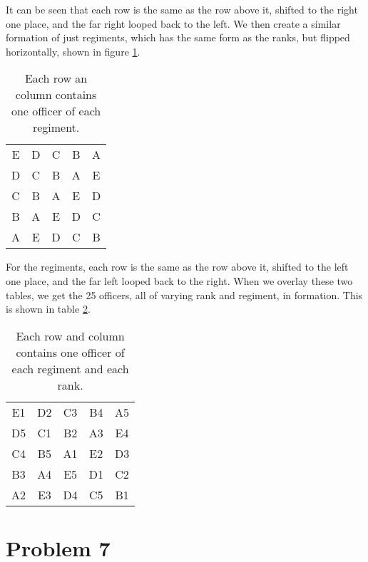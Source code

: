 \documentclass[12pt]{article}
\begin{document}
It can be seen that each row is the same as the row above it, shifted to the right one place, and the far right looped back to the left. We then create a similar formation of just regiments, which has the same form as the ranks, but flipped horizontally, shown in figure \ref{tab:regim}.

\begin{table}[ht]
    \centering
    \begin{tabular}{ccccc}
        E & D & C & B & A \\
        D & C & B & A & E \\
        C & B & A & E & D \\
        B & A & E & D & C \\
        A & E & D & C & B \\
    \end{tabular}
    \caption{Each row an column contains one officer of each regiment.}
    \label{tab:regim}
\end{table}

For the regiments,  each row is the same as the row above it, shifted to the left one place, and the far left looped back to the right. When we overlay these two tables, we get the 25 officers, all of varying rank and regiment, in formation. This is shown in table \ref{tab:both}.

\begin{table}[ht]
    \centering
    \begin{tabular}{ccccc}
        E1 & D2 & C3 & B4 & A5 \\
        D5 & C1 & B2 & A3 & E4 \\
        C4 & B5 & A1 & E2 & D3 \\
        B3 & A4 & E5 & D1 & C2 \\
        A2 & E3 & D4 & C5 & B1 \\
    \end{tabular}
    \caption{Each row and column contains one officer of each regiment and each rank.}
    \label{tab:both}
\end{table}


\section*{Problem 7}
\\
\end{document}

